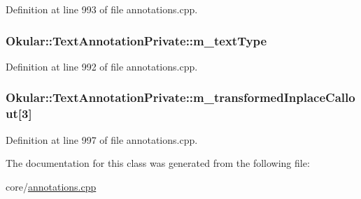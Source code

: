 Definition at line 993 of file annotations.\+cpp.

\hypertarget{classOkular_1_1TextAnnotationPrivate_a585ca2578e082542e18b445ea37cb3af}{
\subsubsection[{m\+\_\+text\+Type}]{ Okular\+::\+Text\+Annotation\+Private\+::m\+\_\+text\+Type}}\label{classOkular_1_1TextAnnotationPrivate_a585ca2578e082542e18b445ea37cb3af}


Definition at line 992 of file annotations.\+cpp.

\hypertarget{classOkular_1_1TextAnnotationPrivate_a5ef2fb11f768115741328be2325d4453}{
\subsubsection[{m\+\_\+transformed\+Inplace\+Callout}]{ Okular\+::\+Text\+Annotation\+Private\+::m\+\_\+transformed\+Inplace\+Callout\mbox{[}3\mbox{]}}}\label{classOkular_1_1TextAnnotationPrivate_a5ef2fb11f768115741328be2325d4453}


Definition at line 997 of file annotations.\+cpp.



The documentation for this class was generated from the following file\+:\begin{DoxyCompactItemize}
\item 
core/\hyperlink{annotations_8cpp}{annotations.\+cpp}\end{DoxyCompactItemize}
